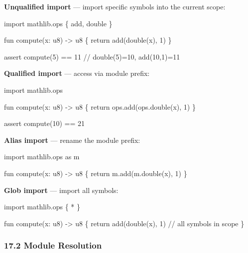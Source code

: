 \documentclass[
  11pt,
]{article}
\newenvironment{Shaded}{\begin{snugshade}}{\end{snugshade}}
\newcommand{\NormalTok}[1]{#1}
\begin{document}
\textbf{Unqualified import} --- import specific symbols into the current
scope:

\begin{Shaded}
\begin{Highlighting}[]
\NormalTok{import mathlib.ops \{ add, double \}}

\NormalTok{fun compute(x: u8) {-}\textgreater{} u8 \{}
\NormalTok{    return add(double(x), 1)}
\NormalTok{\}}

\NormalTok{assert compute(5) == 11   // double(5)=10, add(10,1)=11}
\end{Highlighting}
\end{Shaded}

\textbf{Qualified import} --- access via module prefix:

\begin{Shaded}
\begin{Highlighting}[]
\NormalTok{import mathlib.ops}

\NormalTok{fun compute(x: u8) {-}\textgreater{} u8 \{}
\NormalTok{    return ops.add(ops.double(x), 1)}
\NormalTok{\}}

\NormalTok{assert compute(10) == 21}
\end{Highlighting}
\end{Shaded}

\textbf{Alias import} --- rename the module prefix:

\begin{Shaded}
\begin{Highlighting}[]
\NormalTok{import mathlib.ops as m}

\NormalTok{fun compute(x: u8) {-}\textgreater{} u8 \{}
\NormalTok{    return m.add(m.double(x), 1)}
\NormalTok{\}}
\end{Highlighting}
\end{Shaded}

\textbf{Glob import} --- import all symbols:

\begin{Shaded}
\begin{Highlighting}[]
\NormalTok{import mathlib.ops \{ * \}}

\NormalTok{fun compute(x: u8) {-}\textgreater{} u8 \{}
\NormalTok{    return add(double(x), 1)   // all symbols in scope}
\NormalTok{\}}
\end{Highlighting}
\end{Shaded}

\hypertarget{module-resolution}{%
\subsubsection{17.2 Module Resolution}\label{module-resolution}}
\end{document}

